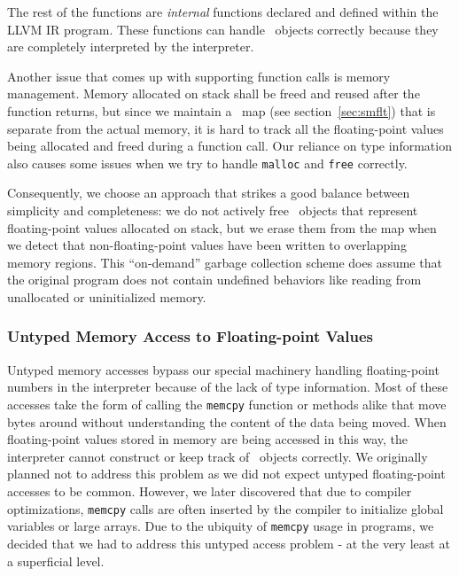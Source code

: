The rest of the functions are {\em internal} functions declared and defined within the LLVM IR program. These functions can handle \smartfloat~objects correctly because they are completely interpreted by the interpreter.

Another issue that comes up with supporting function calls is memory management. Memory allocated on stack shall be freed and reused after the function returns, but since we maintain a \smartfloat~map (see section~\ref{sec:smflt}) that is separate from the actual memory, it is hard to track all the floating-point values being allocated and freed during a function call. Our reliance on type information also causes some issues when we try to handle \texttt{malloc} and \texttt{free} correctly.

Consequently, we choose an approach that strikes a good balance between simplicity and completeness: we do not actively free \smartfloat~objects that represent floating-point values allocated on stack, but we erase them from the map when we detect that non-floating-point values have been written to overlapping memory regions. This ``on-demand'' garbage collection scheme does assume that the original program does not contain undefined behaviors like reading from unallocated or uninitialized memory.

\subsubsection{Untyped Memory Access to Floating-point Values}

Untyped memory accesses bypass our special machinery handling floating-point numbers in the interpreter because of the lack of type information. Most of these accesses take the form of calling the \texttt{memcpy} function or methods alike that move bytes around without understanding the content of the data being moved. When floating-point values stored in memory are being accessed in this way, the interpreter cannot construct or keep track of \smartfloat~objects correctly. We originally planned not to address this problem as we did not expect untyped floating-point accesses to be common. However, we later discovered that due to compiler optimizations, \texttt{memcpy} calls are often inserted by the compiler to initialize global variables or large arrays. Due to the ubiquity of \texttt{memcpy} usage in programs, we decided that we had to address this untyped access problem - at the very least at a superficial level.

